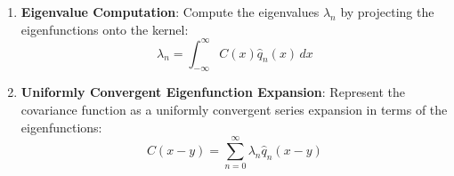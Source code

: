 \documentclass{article}
\begin{document}
\begin{enumerate}
  \item \textbf{Eigenvalue Computation}:
  Compute the eigenvalues $\lambda_n$ by projecting the eigenfunctions onto the kernel:
  \[
  \lambda_n = \int_{-\infty}^\infty C(x) \hat{q}_n(x) \, dx
  \]

  \item \textbf{Uniformly Convergent Eigenfunction Expansion}:
  Represent the covariance function as a uniformly convergent series expansion in terms of the eigenfunctions:
  \[
  C(x-y) = \sum_{n=0}^\infty \lambda_n \hat{q}_n(x - y)
  \]
\end{enumerate}
\end{document}
